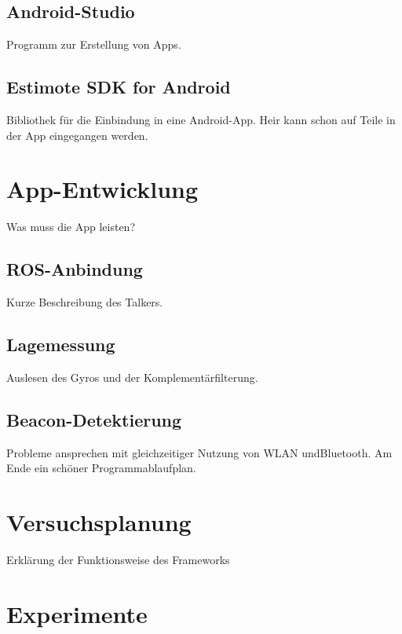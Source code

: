 \subsection{Android-Studio}
Programm zur Erstellung von Apps.
\subsection{Estimote SDK for Android}
Bibliothek für die Einbindung in eine Android-App. Heir kann schon auf Teile in der App eingegangen werden.
\section{App-Entwicklung}
Was muss die App leisten?
\subsection{ROS-Anbindung}
Kurze Beschreibung des Talkers.
\subsection{Lagemessung}
Auslesen des Gyros und der Komplementärfilterung.
\subsection{Beacon-Detektierung}
Probleme ansprechen mit gleichzeitiger Nutzung von WLAN undBluetooth. Am Ende ein schöner Programmablaufplan.

\section{Versuchsplanung}
Erklärung der Funktionsweise des Frameworks

\section{Experimente}
